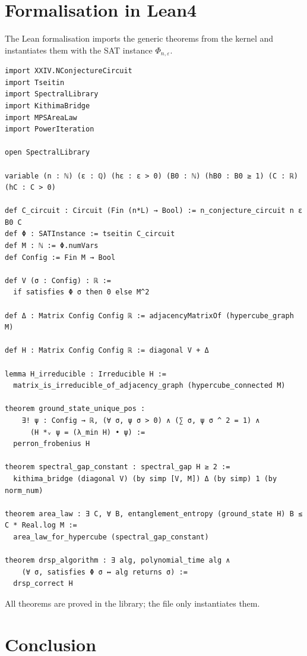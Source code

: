 \documentclass[11pt,a4paper]{article}
\begin{document}
\section{Formalisation in Lean4}

The Lean formalisation imports the generic theorems from the kernel and instantiates them with the SAT instance $\Phi_{n,\varepsilon}$.

\begin{lstlisting}[style=lean, caption={SeriesXXIV/NConjectureHamiltonian.lean (excerpt)}]
import XXIV.NConjectureCircuit
import Tseitin
import SpectralLibrary
import KithimaBridge
import MPSAreaLaw
import PowerIteration

open SpectralLibrary

variable (n : ℕ) (ε : ℚ) (hε : ε > 0) (B0 : ℕ) (hB0 : B0 ≥ 1) (C : ℝ) (hC : C > 0)

def C_circuit : Circuit (Fin (n*L) → Bool) := n_conjecture_circuit n ε B0 C
def Φ : SATInstance := tseitin C_circuit
def M : ℕ := Φ.numVars
def Config := Fin M → Bool

def V (σ : Config) : ℝ :=
  if satisfies Φ σ then 0 else M^2

def Δ : Matrix Config Config ℝ := adjacencyMatrixOf (hypercube_graph M)

def H : Matrix Config Config ℝ := diagonal V + Δ

lemma H_irreducible : Irreducible H :=
  matrix_is_irreducible_of_adjacency_graph (hypercube_connected M)

theorem ground_state_unique_pos :
    ∃! ψ : Config → ℝ, (∀ σ, ψ σ > 0) ∧ (∑ σ, ψ σ ^ 2 = 1) ∧
      (H *ᵥ ψ = (λ_min H) • ψ) :=
  perron_frobenius H

theorem spectral_gap_constant : spectral_gap H ≥ 2 :=
  kithima_bridge (diagonal V) (by simp [V, M]) Δ (by simp) 1 (by norm_num)

theorem area_law : ∃ C, ∀ B, entanglement_entropy (ground_state H) B ≤ C * Real.log M :=
  area_law_for_hypercube (spectral_gap_constant)

theorem drsp_algorithm : ∃ alg, polynomial_time alg ∧
    (∀ σ, satisfies Φ σ ↔ alg returns σ) :=
  drsp_correct H
\end{lstlisting}

All theorems are proved in the library; the file only instantiates them.

\section{Conclusion}
\end{document}
